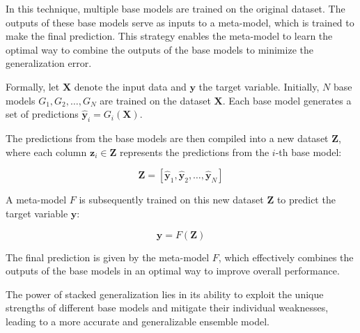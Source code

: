 In this technique, multiple base models are trained on the original dataset. 
The outputs of these base models serve as inputs to a meta-model, which is trained to make the final prediction.
This strategy enables the meta-model to learn the optimal way to combine the outputs of the base models to minimize the generalization error.

Formally, let $\mathbf{X}$ denote the input data and $\mathbf{y}$ the target variable.
Initially, $N$ base models $G_1, G_2, \ldots, G_N$ are trained on the dataset $\mathbf{X}$.
Each base model generates a set of predictions $\hat{\mathbf{y}}_i = G_i(\mathbf{X})$.

The predictions from the base models are then compiled into a new dataset $\mathbf{Z}$, where each column $\mathbf{z}_i \in \mathbf{Z}$ represents the predictions from the $i$-th base model:

$$
\mathbf{Z} = [\hat{\mathbf{y}}_1, \hat{\mathbf{y}}_2, \ldots, \hat{\mathbf{y}}_N]
$$

A meta-model $F$ is subsequently trained on this new dataset $\mathbf{Z}$ to predict the target variable $\mathbf{y}$:

$$
\mathbf{\hat{y}} = F(\mathbf{Z})
$$

The final prediction is given by the meta-model $F$, which effectively combines the outputs of the base models in an optimal way to improve overall performance. 

The power of stacked generalization lies in its ability to exploit the unique strengths of different base models and mitigate their individual weaknesses, leading to a more accurate and generalizable ensemble model.